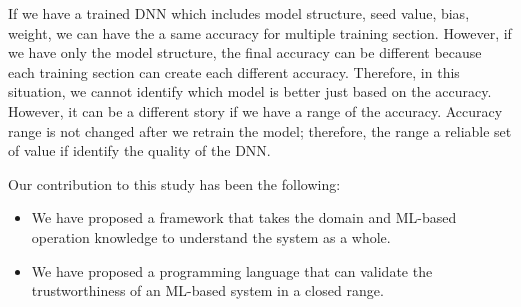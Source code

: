 If we have a trained DNN which includes model structure, seed value, bias, weight, we can have the a same accuracy for multiple training section. However, if we have only the model structure, the final accuracy can be different because each training section can create each different accuracy. Therefore, in this situation, we cannot identify which model is better just based on the accuracy. However, it can be a different story if we have a range of the accuracy. Accuracy range is not changed after we retrain the model; therefore, the range a reliable set of value if identify the quality of the DNN.





Our contribution to this study has been the following:
\begin{itemize}
	\item We have proposed a framework that takes the domain and ML-based operation knowledge to understand the system as a whole.
	\item We have proposed a programming language that can validate the trustworthiness of an ML-based system in a closed range.
\end{itemize}
